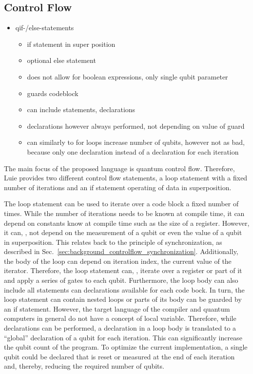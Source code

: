 \subsection{Control Flow}
\label{sec:concept_controlFlow}
\begin{itemize}
    \item qif-/else-statements
    \begin{itemize}
        \item if statement in super position
        \item optional else statement
        \item does not allow for boolean expressions, only single qubit parameter
        \item guards codeblock
        \item can include statements, declarations
        \item declarations however always performed, not depending on value of guard
        \item can similarly to for loops increase number of qubits, however not as bad, because only one declaration instead of a declaration for each iteration 
    \end{itemize}
\end{itemize}
The main focus of the proposed language is quantum control flow. Therefore, Luie provides two different control flow statements, a loop statement with a fixed number of iterations and an if statement operating of data in superposition. 

The loop statement can be used to iterate over a code block a fixed number of times. While the number of iterations needs to be known at compile time, it can depend on constants know at compile time such as the size of a register. However, it can, \eg, not depend on the measurement of a qubit or even the value of a qubit in superposition. This relates back to the principle of synchronization, as described in Sec.~\ref{sec:background_controlflow_synchronization}. Additionally, the body of the loop can depend on iteration index, \ie the current value of the iterator. Therefore, the loop statement can, \eg, iterate over a register or part of it and apply a series of gates to each qubit. Furthermore, the loop body can also include all statements can declarations available for each code bock. In turn, the loop statement can contain nested loops or parts of its body can be guarded by an if statement. However, the target language of the compiler and quantum computers in general do not have a concept of local variable. Therefore, while declarations can be performed, a declaration in a loop body is translated to a ``global'' declaration of a qubit for each iteration. This can significantly increase the qubit count of the program. To optimize the current implementation, a single qubit could be declared that is reset or measured at the end of each iteration and, thereby, reducing the required number of qubits.

